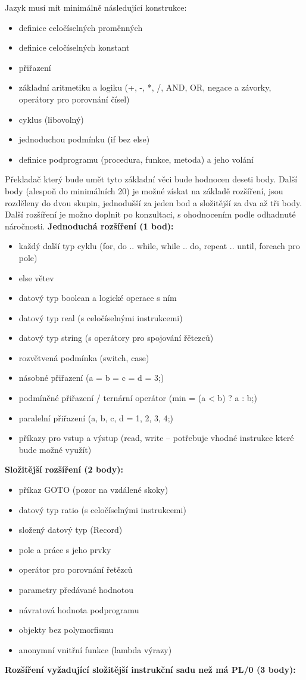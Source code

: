 \documentclass[
12pt,
a4paper,
pdftex,
czech,
titlepage
]{report}
\begin{document}
Jazyk musí mít minimálně následující konstrukce:

\begin{itemize}
\item definice celočíselných proměnných
\item definice celočíselných konstant
\item přiřazení
\item základní aritmetiku a logiku (+, -, *, /, AND, OR, negace a závorky, operátory pro porovnání čísel)
\item cyklus (libovolný)
\item jednoduchou podmínku (if bez else)
\item definice podprogramu (procedura, funkce, metoda) a jeho volání
\end{itemize}

Překladač který bude umět tyto základní věci bude hodnocen deseti body. Další body (alespoň do minimálních 20) je možné získat na základě rozšíření, jsou rozděleny do dvou skupin, jednodušší za jeden bod a složitější za dva až tři body. Další rozšíření je možno doplnit po konzultaci, s ohodnocením podle odhadnuté náročnosti.\newline
\textbf{Jednoduchá rozšíření (1 bod):}
\begin{itemize}
\item každý další typ cyklu (for, do .. while, while .. do, repeat .. until, foreach pro pole)
\item else větev
\item datový typ boolean a logické operace s ním
\item datový typ real (s celočíselnými instrukcemi)
\item datový typ string (s operátory pro spojování řětezců)
\item rozvětvená podmínka (switch, case)
\item násobné přiřazení (a = b = c = d = 3;)
\item podmíněné přiřazení / ternární operátor (min = (a < b) ? a : b;)
\item paralelní přiřazení ({a, b, c, d} = {1, 2, 3, 4};)
\item příkazy pro vstup a výstup (read, write -- potřebuje vhodné instrukce které bude možné využít)
\end{itemize}
\textbf{Složitější rozšíření (2 body):}
\begin{itemize}
\item příkaz GOTO (pozor na vzdálené skoky)
\item datový typ ratio (s celočíselnými instrukcemi)
\item složený datový typ (Record)
\item pole a práce s jeho prvky
\item operátor pro porovnání řetězců
\item parametry předávané hodnotou
\item návratová hodnota podprogramu
\item objekty bez polymorfismu
\item anonymní vnitřní funkce (lambda výrazy)
\end{itemize}
\textbf{Rozšíření vyžadující složitější instrukční sadu než má PL/0 (3 body):}
\end{document}
